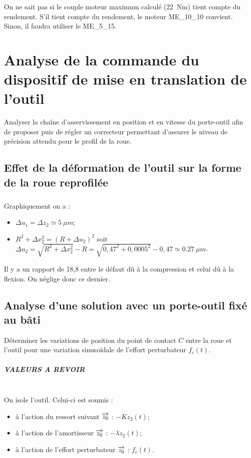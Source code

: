 \documentclass[10pt,fleqn]{article} %
\begin{document}
On ne sait pas si le couple moteur maximum calculé (\SI{22}{Nm}) tient compte du rendement. 
S'il tient compte du rendement, le moteur ME\_10\_10 convient. Sinon, il faudra utiliser le ME\_5\_15. 

\section{Analyse de la commande du dispositif de mise en translation de l’outil}
\begin{obj}
Analyser la chaîne d’asservissement en position et en vitesse du porte-outil afin de proposer puis de régler un correcteur permettant d’assurer le niveau de précision attendu pour le profil de la roue.
\end{obj}

\subsection{Effet de la déformation de l’outil sur la forme de la roue reprofilée}

\subparagraph{} %

Graphiquement on a :
\begin{itemize}
\item $\Delta u_1 = \Delta z_2 \simeq \SI{5}{\mu m}$;
\item $R^2 + \Delta x_2^2 = \left(R + \Delta u_2\right)^2$ soit $\Delta u_2 = \sqrt{R^2 + \Delta x_2^2} - R = \sqrt{0,47^2 + 0,0005^2} - 0,47 \simeq \SI{0,27}{\mu m}$.%
\end{itemize}
Il y a un rapport de 18,8 entre le défaut dû à la compression et celui dû à la flexion. On néglige donc ce dernier. 
 

\subsection{Analyse d’une solution avec un porte-outil fixé au bâti}
\begin{obj}
Déterminer les variations de position du point de contact $C$ entre la roue et l’outil pour une variation
sinusoïdale de l’effort perturbateur $f_c(t)$.
\end{obj}


\subparagraph{VALEURS A REVOIR} %
~\\

On isole l'outil. Celui-ci est soumis :
\begin{itemize}
\item à l'action du ressort suivant $\overrightarrow{z_0}$ : $-Kz_2(t)$;
\item à l'action de l'amortisseur $\overrightarrow{z_0}$ : $-\lambda \dot{z}_2(t)$;
\item à l'action de l'effort perturbateur $\overrightarrow{z_0}$ : $f_c(t)$. 
\end{itemize}
\end{document}
